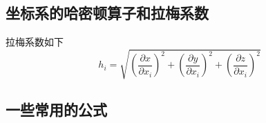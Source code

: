 \documentclass[twocolumn]{ctexart}
\begin{document}
\subsection{坐标系的哈密顿算子和拉梅系数}
拉梅系数如下
\begin{equation}
  h_{i}= \sqrt{(\frac{\partial x}{\partial x_{i}})^{2}+(\frac{\partial y}{\partial x_{i}})^{2}+(\frac{\partial z}{\partial x_{i}})^{2}}\tag{1.7}
\end{equation}
\subsection{一些常用的公式}
\end{document}
